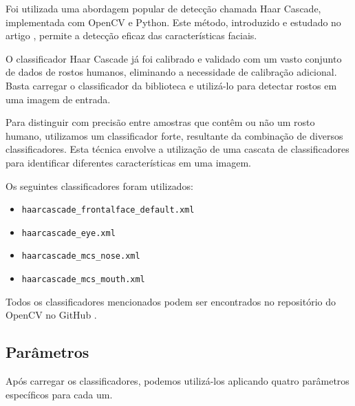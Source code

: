 Foi utilizada uma abordagem popular de detecção chamada Haar Cascade, implementada com OpenCV e Python. Este método, introduzido e estudado no artigo \cite{BoostedCascade}, permite a detecção eficaz das características faciais.

O classificador Haar Cascade já foi calibrado e validado com um vasto conjunto de dados de rostos humanos, eliminando a necessidade de calibração adicional. Basta carregar o classificador da biblioteca e utilizá-lo para detectar rostos em uma imagem de entrada.

Para distinguir com precisão entre amostras que contêm ou não um rosto humano, utilizamos um classificador forte, resultante da combinação de diversos classificadores. Esta técnica envolve a utilização de uma cascata de classificadores para identificar diferentes características em uma imagem.

Os seguintes classificadores foram utilizados:
\begin{itemize}
    \item \texttt{haarcascade\_frontalface\_default.xml}
    \item \texttt{haarcascade\_eye.xml}
    \item \texttt{haarcascade\_mcs\_nose.xml}
    \item \texttt{haarcascade\_mcs\_mouth.xml}
\end{itemize}

Todos os classificadores mencionados podem ser encontrados no repositório do OpenCV no GitHub \cite{HaarAplicacao}.

\subsection{Parâmetros}

Após carregar os classificadores, podemos utilizá-los aplicando quatro parâmetros específicos para cada um.

